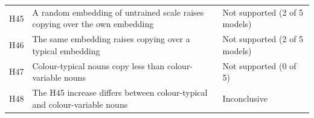 \begin{table}[!htbp]
\begin{tabular}{@{}lp{}p{}@{}}
H45 & A random embedding of untrained scale raises copying over the own embedding & Not supported (2 of 5 models) \\
H46 & The same embedding raises copying over a typical embedding & Not supported (2 of 5 models) \\
H47 & Colour-typical nouns copy less than colour-variable nouns & Not supported (0 of 5) \\
H48 & The H45 increase differs between colour-typical and colour-variable nouns & Inconclusive \\
\bottomrule
\end{tabular}
\end{table}
